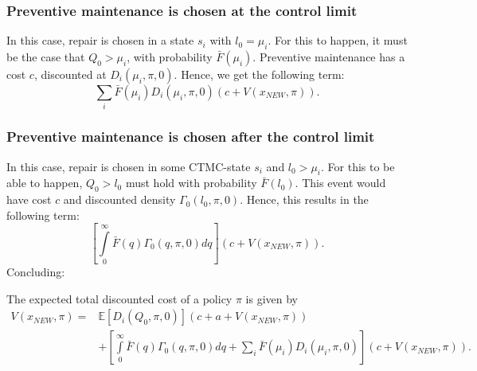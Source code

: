 \subsubsection{Preventive maintenance is chosen at the control limit}
In this case, repair is chosen in a state $s_i$ with $l_0=\mu_i$.
For this to happen, it must be the case that $Q_0>\mu_i$, with probability $\bar{F}(\mu_i)$.
Preventive maintenance has a cost $c$, discounted at $D_{i}(\mu_i,\pi,0)$.
Hence, we get the following term:
\[
\sum\limits_i\bar{F}(\mu_i)D_{i}(\mu_i,\pi,0)(c+V(x_{NEW},\pi)).
\]

\subsubsection{Preventive maintenance is chosen after the control limit}
In this case, repair is chosen in some CTMC-state $s_i$ and $l_0>\mu_i$.
For this to be able to happen, $Q_0>l_0$ must hold with probability $\bar{F}(l_0)$.
This event would have cost $c$ and discounted density $\Gamma_0(l_0,\pi,0)$.
Hence, this results in the following term:
\[
\left[\int\limits_0^\infty \bar{F}(q)\Gamma_0(q,\pi,0)dq\right](c+V(x_{NEW},\pi)).
\]
Concluding:
\begin{theorem}
	The expected total discounted cost of a policy $\pi$ is given by
	\begin{equation}\label{eq:MmfmTDC}
	\begin{split}
	V(x_{NEW},\pi)=&\mathbb{E}[D_{i}(Q_0,\pi,0)]\left(c+a+V(x_{NEW},\pi)\right)\\
	&+\left[\int\limits_0^\infty \bar{F}(q)\Gamma_0(q,\pi,0)dq+\sum\limits_i\bar{F}(\mu_i)D_{i}(\mu_i,\pi,0)\right]\left(c+V(x_{NEW},\pi)\right).
	\end{split}
	\end{equation}
\end{theorem}